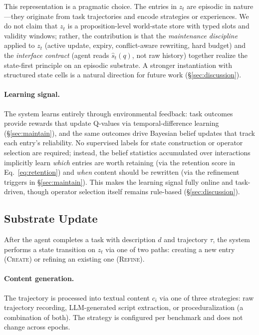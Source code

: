This representation is a pragmatic choice. The entries in $z_t$ are episodic in nature---they originate from task trajectories and encode strategies or experiences. We do not claim that $z_t$ is a proposition-level world-state store with typed slots and validity windows; rather, the contribution is that the \emph{maintenance discipline} applied to $z_t$ (active update, expiry, conflict-aware rewriting, hard budget) and the \emph{interface contract} (agent reads $\hat{s}_t(q)$, not raw history) together realize the state-first principle on an episodic substrate. A stronger instantiation with structured state cells is a natural direction for future work (\S\ref{sec:discussion}).

\paragraph{Learning signal.}
The system learns entirely through environmental feedback: task outcomes provide rewards that update Q-values via temporal-difference learning (\S\ref{sec:maintain}), and the same outcomes drive Bayesian belief updates that track each entry's reliability. No supervised labels for state construction or operator selection are required; instead, the belief statistics accumulated over interactions implicitly learn \emph{which} entries are worth retaining (via the retention score in Eq.~\ref{eq:retention}) and \emph{when} content should be rewritten (via the refinement triggers in \S\ref{sec:maintain}). This makes the learning signal fully online and task-driven, though operator selection itself remains rule-based (\S\ref{sec:discussion}).


\subsection{Substrate Update}
\label{sec:construct}

After the agent completes a task with description $d$ and trajectory $\tau$, the system performs a state transition on $z_t$ via one of two paths: creating a new entry (\textsc{Create}) or refining an existing one (\textsc{Refine}).

\paragraph{Content generation.}
The trajectory is processed into textual content $c_i$ via one of three strategies: raw trajectory recording, LLM-generated script extraction, or proceduralization (a combination of both). The strategy is configured per benchmark and does not change across epochs.

